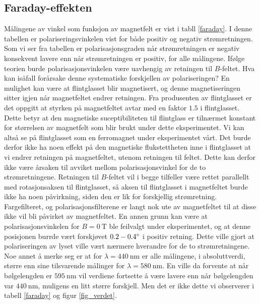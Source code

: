 \documentclass[%
 reprint,
 amsmath,amssymb,
 aps,
 norsk,
]{revtex4-1}
\begin{document}
\subsection{Faraday-effekten}
Målingene av vinkel som funksjon av magnetfelt er vist i tabll \vref{faraday}. I denne tabellen er polariseringsvinkelen vist for både positiv og negativ strømretningen. Som vi ser fra tabellen er polarisasjonsgraden når strømretningen er negativ konsekvent lavere enn når strømretningen er positiv, for alle målingene. Ifølge teorien burde polarisasjonsvinkelen være uavhengig av retningen til $B$-feltet. Hva kan isåfall forårsake denne systematiske forskjellen av polariseringen? En mulighet kan være at flintglasset blir magnetisert, og denne magnetiseringen sitter igjen når magnetfeltet endrer retningen. Fra produsenten av flintglasset er det oppgitt at styrken på magnetfeltet avtar med en faktor $1.5$ i flintglasset. Dette betyr at den magnetiske suceptibiliteten til flintglass er tilnærmet konstant for størrelsen av magnetfelt som blir brukt under dette eksperimentet. Vi kan altså se på flintglasset som en ferromagnet under eksperimentet vårt. Det burde derfor ikke ha noen effekt på den magnetiske flukstettheten inne i flintglasset at vi endrer retningen på magnetfeltet, utenom retningen til feltet. Dette kan derfor ikke være årsaken til avviket mellom polarisasjonsvinkel for de to strømretningene. Retningen til $B$-feltet vil i begge tilfeller være rettet parallellt med rotasjonsaksen til flintglasset, så aksen til flintglasset i magnetfeltet burde ikke ha noen påvirkning, siden den er lik for forskjellig strømretning. Fargefilteret, og polarisasjonsfilterene er langt nok ute av magnetfeltet til at disse ikke vil bli påvirket av magnetfeltet. En annen grunn kan være at polarisasjonsvinkelen for $B=\SI{0}{\tesla}$ ble feilvalgt under eksperimentet, og at denne posisjonen burrde vært forskjøvet $0.2-0.4\degree$ i positiv retning. Dette ville gjort at polariseringen av lyset ville vært nærmere hverandre for de to strømretningene.\\
Noe annet å merke seg er at for $\lambda=\SI{440}{\nano\meter}$ er alle målingene, i absoluttverdi, større enn sine tilsvarende målinger for $\lambda=\SI{580}{\nano\meter}$. En ville da forvente at når bølgelengden er  $\SI{595}{\nano\meter}$ vil verdiene fortsette å være lavere enn når bølgelengden var $\SI{440}{\nano\meter}$, muligens en litt større forskjell. Men det er ikke dette vi observerer i tabell \vref{faraday} og figur \vref{fig_verdet}.
\end{document}
